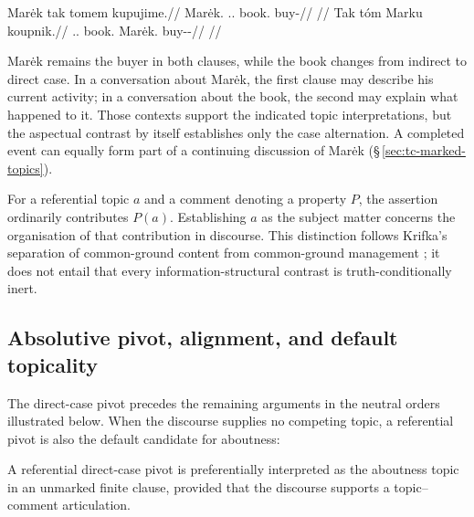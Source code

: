 \pex\label{ex:tc-topic-subj}
\a
\begingl
\gla Marėk tak tomem kupujime.//
\glb Marėk.\Dir{} \Dem{}.\Prox{}.\Dir{} book.\Ind{} buy-\Prog{}//
\glft {}
      //
\endgl
\a
\begingl
\gla Tak tóm Marku koupnik.//
\glb \Dem{}.\Prox{}.\Dir{} book.\Dir{} Marėk.\Trs{} buy-\Trs{}-\Pf{}//
\glft {}
      //
\endgl
\xe

\noindent Marėk remains the buyer in both clauses, while the book changes
 from indirect to direct case. In a conversation about Marėk, the first clause
 may describe his current activity; in a conversation about the book, the
 second may explain what happened to it. Those contexts support the indicated
 topic interpretations, but the aspectual contrast by itself establishes only
 the case alternation. A completed event can equally form part of a continuing
 discussion of Marėk (§\,\ref{sec:tc-marked-topics}).

For a referential topic $a$ and a comment denoting a property $P$, the assertion
 ordinarily contributes $P(a)$. Establishing $a$ as the subject matter concerns
 the organisation of that contribution in discourse. This distinction follows
 Krifka's separation of common-ground content from common-ground management
 \cite[§\,2.2]{krifka2008}; it does not entail that every information-structural
 contrast is truth-conditionally inert.

\subsection{Absolutive pivot, alignment, and default topicality}
\label{sec:tc-abs-align}

The direct-case pivot precedes the remaining arguments in the neutral orders
 illustrated below. When the discourse supplies no competing topic, a
 referential pivot is also the default candidate for aboutness:

\begin{description}[leftmargin=2em, labelwidth=!, labelindent=0em]
\item[\upshape Absolutive--Topic Alignment:] A referential direct-case pivot
 is preferentially interpreted as the aboutness topic in an unmarked finite
 clause, provided that the discourse supports a topic--comment articulation.
\end{description}

